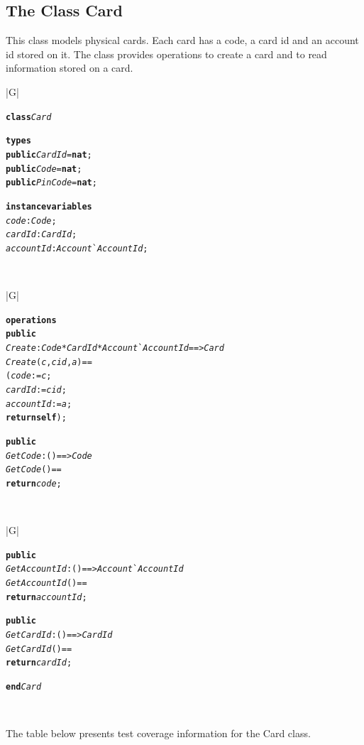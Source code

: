 \documentclass[\pformat,12pt,twoside]{article}
\newenvironment{VDMgray}%
{\begin{tabular}{|G|}\hline\small\begin{alltt}}%
{\end{alltt}\normalsize\\
 \hline\end{tabular}}
\begin{document}
\subsection{The Class Card}

This class models physical cards. Each card has a code, a card 
id and an account id stored on it. The class provides operations 
to create a card and to read information stored on a card.

\begin{VDMgray}
\textbf{class} \textit{Card}

\textbf{types}
 \textbf{public} \textit{CardId} = \textbf{nat};
 \textbf{public} \textit{Code} = \textbf{nat};
 \textbf{public} \textit{PinCode} = \textbf{nat};

\textbf{instance} \textbf{variables}
 \textit{code} : \textit{Code};
 \textit{cardId} : \textit{CardId};
 \textit{accountId} : \textit{Account}\`{}\textit{AccountId};
\end{VDMgray}

\begin{VDMgray}
\textbf{operations}
 \textbf{public}
 \textit{Create} : \textit{Code} * \textit{CardId} * \textit{Account}\`{}\textit{AccountId} ==\texttt{>} \textit{Card}
 \textit{Create}(\textit{c},\textit{cid},\textit{a}) ==
   (\textit{code} := \textit{c};
    \textit{cardId} := \textit{cid};
    \textit{accountId} := \textit{a};
    \textbf{return} \textbf{self});

 \textbf{public}
 \textit{GetCode} : () ==\texttt{>} \textit{Code}
 \textit{GetCode}() ==
   \textbf{return} \textit{code};
\end{VDMgray}

\begin{VDMgray}
 \textbf{public}
 \textit{GetAccountId} : () ==\texttt{>} \textit{Account}\`{}\textit{AccountId}
 \textit{GetAccountId}() ==
   \textbf{return} \textit{accountId};

 \textbf{public}
 \textit{GetCardId} : () ==\texttt{>} \textit{CardId}
 \textit{GetCardId}() ==
   \textbf{return} \textit{cardId};

\textbf{end} \textit{Card}
\end{VDMgray}


The table below presents test coverage information for the Card 
class.
\end{document}
